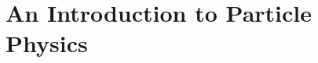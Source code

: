 \documentclass[11pt, twoside, a4paper]{book}
\begin{document}









  \part{An Introduction to Particle Physics}

    
    \cleardoublepage

    
    \cleardoublepage

    
    \cleardoublepage

    
    \cleardoublepage

    
    \cleardoublepage








\end{document}
